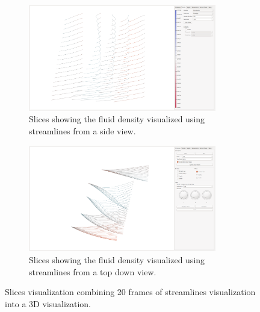 \begin{figure}[tbh]
	\centering
	\begin{subfigure}{0.45\textwidth}
		\centering
		\includegraphics[width=0.9\textwidth, trim={35px 30px 430px 30px}, clip]{img/slices/streamlines_side}
		\caption{Slices showing the fluid density visualized using streamlines from a side view.}
		\label{fig:slices:streamlines:side}
	\end{subfigure}
	\hspace{30px}
	\begin{subfigure}{0.45\textwidth}	
		\centering
		\includegraphics[width=0.9\textwidth, trim={35px 30px 430px 30px}, clip]{img/slices/streamlines_topdown}
		\caption{Slices showing the fluid density visualized using streamlines from a top down view.}
		\label{fig:slices:streamlines:top}
	\end{subfigure}
	\caption{Slices visualization combining 20 frames of streamlines visualization into a 3D visualization.}
	\label{fig:slices:streamlines}
\end{figure}




